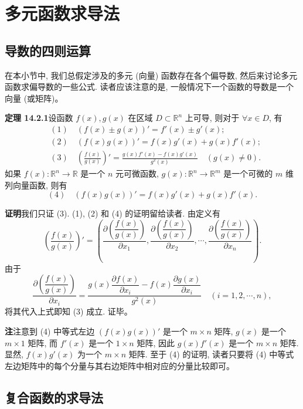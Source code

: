 \documentclass[UTF8,12pt,a4paper,fontset=fandol]{ctexart}
\begin{document}
\section{多元函数求导法}

\subsection{导数的四则运算}

在本小节中, 我们总假定涉及的多元 (向量) 函数存在各个偏导数, 然后来讨论多元函数求偏导数的一些公式. 读者应该注意的是, 一般情况下一个函数的导数是一个向量 (或矩阵)。

\noindent\textbf{定理 14.2.1}\quad 设函数 $f(x),g(x)$ 在区域 $D\subset\mathbb R^n$ 上可导, 则对于 $\forall x\in D$, 有
\[
\begin{aligned}
  &(1)\quad (f(x)\pm g(x))'=f'(x)\pm g'(x);\\
  &(2)\quad (f(x)g(x))'=f(x)g'(x)+g(x)f'(x);\\
  &(3)\quad \left(\frac{f(x)}{g(x)}\right)'=
  \frac{g(x)f'(x)-f(x)g'(x)}{g^2(x)}\quad (g(x)\ne0).
\end{aligned}
\]
如果 $f(x):\mathbb R^n\to\mathbb R$ 是一个 $n$ 元可微函数, $g(x):\mathbb R^n\to\mathbb R^m$ 是一个可微的 $m$ 维列向量函数, 则有
\[
  (4)\quad (f(x)g(x))'=f(x)g'(x)+g(x)f'(x).
\]

\noindent\textbf{证明}\quad 我们只证 (3). (1), (2) 和 (4) 的证明留给读者. 由定义有
\[
  \left(\frac{f(x)}{g(x)}\right)'=
  \left(
    \frac{\partial\left(\dfrac{f(x)}{g(x)}\right)}{\partial x_1},
    \frac{\partial\left(\dfrac{f(x)}{g(x)}\right)}{\partial x_2},
    \cdots,
    \frac{\partial\left(\dfrac{f(x)}{g(x)}\right)}{\partial x_n}
  \right).
\]
由于
\[
  \frac{\partial\left(\dfrac{f(x)}{g(x)}\right)}{\partial x_i}
  =
  \frac{g(x)\dfrac{\partial f(x)}{\partial x_i}-f(x)\dfrac{\partial g(x)}{\partial x_i}}{g^2(x)}
  \quad (i=1,2,\cdots,n),
\]
将其代入上式即知 (3) 成立. 证毕。

\noindent\textbf{注}\quad 注意到 (4) 中等式左边 $(f(x)g(x))'$ 是一个 $m\times n$ 矩阵, $g(x)$ 是一个 $m\times1$ 矩阵, 而 $f'(x)$ 是一个 $1\times n$ 矩阵, 因此 $g(x)f'(x)$ 是一个 $m\times n$ 矩阵. 显然, $f(x)g'(x)$ 为一个 $m\times n$ 矩阵. 至于 (4) 的证明, 读者只要将 (4) 中等式左边矩阵中的每个分量与其右边矩阵中相对应的分量比较即可。

\subsection{复合函数的求导法}
\end{document}
